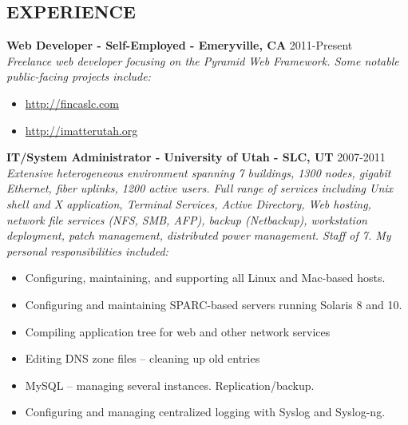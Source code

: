 \documentclass[line,margin]{res}
\begin{document}
\date{\today}
\address{\href{mailto:parker@parkerpinette.com}{parker@parkerpinette.com} \\ (801) 638-8611 \\ \url{https://github.com/ppinette}}

\begin{resume}

\section{EXPERIENCE}
 {\bf Web Developer - Self-Employed - Emeryville, CA} \hfill 2011-Present\\
 {\sl Freelance web developer focusing on the Pyramid Web Framework. Some notable public-facing projects include:}
  \begin{itemize} \itemsep -2pt %
  \item \url{http://fincaslc.com}  %
  \item \url{http://imatterutah.org}
  \end{itemize}
 {\bf IT/System Administrator - University of Utah - SLC, UT} \hfill 2007-2011\\
 {\sl Extensive heterogeneous environment spanning 7 buildings, 1300 nodes, gigabit Ethernet, fiber uplinks, 1200 active users. Full range of services including Unix shell and X application, Terminal Services, Active Directory, Web hosting, network file services (NFS, SMB, AFP), backup (Netbackup), workstation deployment, patch management, distributed power management. Staff of 7. My personal responsibilities included:}
   \begin{itemize} \itemsep -2pt
   \item Configuring, maintaining, and supporting all Linux and Mac-based hosts.
   \item Configuring and maintaining SPARC-based servers running Solaris 8 and 10.
   \item Compiling application tree for web and other network services
   \item Editing DNS zone files – cleaning up old entries
   \item MySQL – managing several instances. Replication/backup. 
   \item Configuring and managing centralized logging with Syslog and Syslog-ng.

\end{itemize}
\end{resume}
\end{document}
